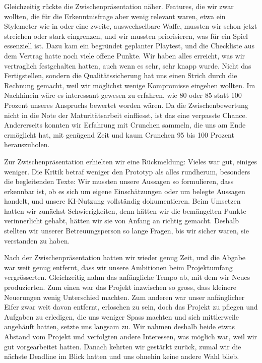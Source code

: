 \documentclass[../Main.tex]{subfiles}
\begin{document}
Gleichzeitig rückte die Zwischenpräsentation näher. Features, die wir zwar wollten, die für die Erkenntnisfrage aber wenig relevant waren, etwa ein Stylemeter wie in \autocite{capcom_devilmaycry_2001} oder eine zweite, auswechselbare Waffe, mussten wir schon jetzt streichen oder stark eingrenzen, und wir mussten priorisieren, was für ein Spiel essenziell ist. Dazu kam ein begründet geplanter Playtest, und die Checkliste aus dem Vertrag hatte noch viele offene Punkte. Wir haben alles erreicht, was wir vertraglich festgehalten hatten, auch wenn es sehr, sehr knapp wurde. Nicht das Fertigstellen, sondern die Qualitätssicherung hat uns einen Strich durch die Rechnung gemacht, weil wir möglichst wenige Kompromisse eingehen wollten. Im Nachhinein wäre es interessant gewesen zu erfahren, wie 80 oder 85 statt 100 Prozent unseres Anspruchs bewertet worden wären. Da die Zwischenbewertung nicht in die Note der Maturitätsarbeit einfliesst, ist das eine verpasste Chance. Andererseits konnten wir Erfahrung mit Crunchen sammeln, die uns am Ende ermöglicht hat, mit genügend Zeit und kaum Crunchen 95 bis 100 Prozent herauszuholen.

Zur Zwischenpräsentation erhielten wir eine Rückmeldung: Vieles war gut, einiges weniger. Die Kritik betraf weniger den Prototyp als alles rundherum, besonders die begleitenden Texte: Wir mussten unsere Aussagen so formulieren, dass erkennbar ist, ob es sich um eigene Einschätzungen oder um belegte Aussagen handelt, und unsere KI-Nutzung vollständig dokumentieren. Beim Umsetzen hatten wir zunächst Schwierigkeiten, denn hätten wir die bemängelten Punkte verinnerlicht gehabt, hätten wir sie von Anfang an richtig gemacht. Deshalb stellten wir unserer Betreuungsperson so lange Fragen, bis wir sicher waren, sie verstanden zu haben.

Nach der Zwischenpräsentation hatten wir wieder genug Zeit, und die Abgabe war weit genug entfernt, dass wir unsere Ambitionen beim Projektumfang vergrösserten. Gleichzeitig nahm das anfängliche Tempo ab, mit dem wir Neues produzierten. Zum einen war das Projekt inzwischen so gross, dass kleinere Neuerungen wenig Unterschied machten. Zum anderen war unser anfänglicher Eifer zwar weit davon entfernt, erloschen zu sein, doch das Projekt zu pflegen und Aufgaben zu erledigen, die uns weniger Spass machten und sich mittlerweile angehäuft hatten, setzte uns langsam zu. Wir nahmen deshalb beide etwas Abstand vom Projekt und verfolgten andere Interessen, was möglich war, weil wir gut vorgearbeitet hatten. Danach kehrten wir gestärkt zurück, zumal wir die nächste Deadline im Blick hatten und uns ohnehin keine andere Wahl blieb.
\end{document}

